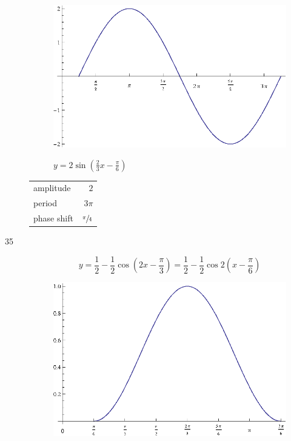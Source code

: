 \documentclass{exam}
\begin{document}
\begin{description}
        \begin{figure}[H]
          \centering
          \includegraphics[scale=1.0]{exercise34.eps}

          $y = 2 \sin \left( \frac{2}{3} x - \frac{\pi}{6} \right)$
        \end{figure}

        \begin{tabular}[H]{lr}
          \toprule
          amplitude   & $2$ \\
          period      & $3 \pi$ \\
          phase shift & $\sfrac{\pi}{4}$ \\
          \bottomrule
        \end{tabular}

      \pagebreak

      \item[35]
        \[
          y = \frac{1}{2} - \frac{1}{2} \cos \left( 2x - \frac{\pi}{3} \right) 
            = \frac{1}{2} - \frac{1}{2} \cos 2 \left( x - \frac{\pi}{6} \right)
        \]

        \begin{figure}[H]
          \centering
          \includegraphics[scale=1.0]{exercise35.eps}


\end{figure}
\end{description}
\end{document}
